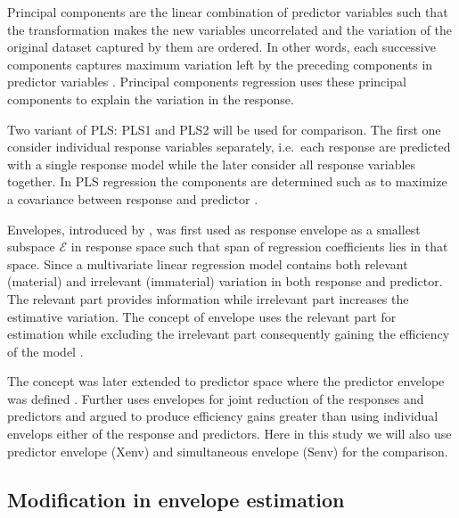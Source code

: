 \documentclass[12pt,3p,authoryear]{elsarticle}
\providecommand{\tightlist}{%
  \setlength{\itemsep}{0pt}\setlength{\parskip}{0pt}}
\theoremstyle{definition}
\theoremstyle{definition}
\theoremstyle{definition}
\theoremstyle{remark}
\begin{document}
\begin{description}
\tightlist
\item[\emph{Principal Components Regression (PCR):}]
Principal components are the linear combination of predictor variables
such that the transformation makes the new variables uncorrelated and
the variation of the original dataset captured by them are ordered. In
other words, each successive components captures maximum variation left
by the preceding components in predictor variables \citep{Jolliffe2002}.
Principal components regression uses these principal components to
explain the variation in the response.
\item[\emph{Partial Least Squares (PLS):}]
Two variant of PLS: PLS1 and PLS2 will be used for comparison. The first
one consider individual response variables separately, i.e.~each
response are predicted with a single response model while the later
consider all response variables together. In PLS regression the
components are determined such as to maximize a covariance between
response and predictor \citep{DeJong1993}.
\item[\emph{Envelopes:}]
Envelopes, introduced by \citet{Cook2007a}, was first used as response
envelope \citep{cook2010envelope} as a smallest subspace \(\mathcal{E}\)
in response space such that span of regression coefficients lies in that
space. Since a multivariate linear regression model contains both
relevant (material) and irrelevant (immaterial) variation in both
response and predictor. The relevant part provides information while
irrelevant part increases the estimative variation. The concept of
envelope uses the relevant part for estimation while excluding the
irrelevant part consequently gaining the efficiency of the model
\citep{cook2016algorithms}.

The concept was later extended to predictor space where the predictor
envelope was defined \citep{cook2013envelopes}. Further
\citet{cook2015simultaneous} uses envelopes for joint reduction of the
responses and predictors and argued to produce efficiency gains greater
than using individual envelops either of the response and predictors.
Here in this study we will also use predictor envelope (Xenv) and
simultaneous envelope (Senv) for the comparison.
\end{description}

\subsection{Modification in envelope
estimation}\label{modification-in-envelope-estimation}
\end{document}
